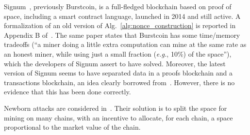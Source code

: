 Signum~\cite{Signum}, previously Burstcoin, is
a full-fledged blockchain based on proof of space, including a smart contract language,
launched in 2014 and still active.
A formalization of an old version of Alg.~\ref{alg:nonce_construction}
is reported in Appendix B of~\cite{ParkKFGAP18}.
The same paper states that Burstcoin has some
time/memory tradeoffs (``a miner doing a little extra computation can mine at the same
rate as an honest miner, while using just a small fraction (\emph{e.g.}, 10\%) of the space''),
which the developers of Signum assert to have solved. Moreover, the latest version of Signum
seems to have separated data in a proofs blockchain and a transactions blockchain,
an idea clearly borrowed from~\cite{ParkKFGAP18}. However, there is no evidence that this
has been done correctly.

Newborn attacks are considered in~\cite{TangZDWLG0L19}. Their solution is
to split the space for mining on many chains, with an
incentive to allocate, for each chain, a space proportional
to the market value of the chain.
